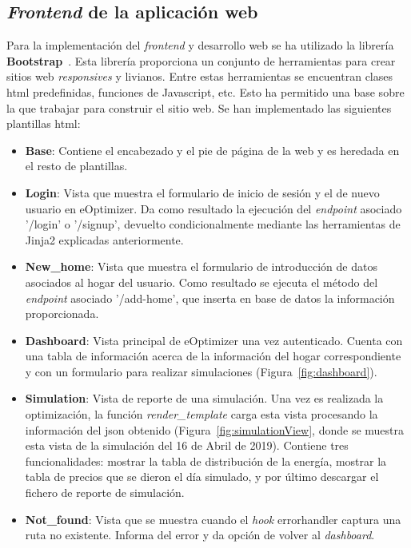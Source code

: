 \subsection{\textit{Frontend} de la aplicación web}
Para la implementación del \textit{frontend} y desarrollo web se ha utilizado la librería \textbf{Bootstrap}~\cite{Boots}. Esta librería proporciona un conjunto de herramientas para crear sitios web \textit{responsives} y livianos. Entre estas herramientas se encuentran clases html predefinidas, funciones de Javascript, etc. Esto ha permitido una base sobre la que trabajar para construir el sitio web. Se han implementado las siguientes plantillas html:
\begin{itemize}
\item \textbf{Base}: Contiene el encabezado y el pie de página de la web y es heredada en el resto de plantillas.
\item \textbf{Login}: Vista que muestra el formulario de inicio de sesión y el de nuevo usuario en eOptimizer. Da como resultado la ejecución del \textit{endpoint} asociado '/login' o '/signup', devuelto condicionalmente mediante las herramientas de Jinja2 explicadas anteriormente.
\item \textbf{New\_home}: Vista que muestra el formulario de introducción de datos asociados al hogar del usuario. Como resultado se ejecuta el método del \textit{endpoint} asociado '/add-home', que inserta en base de datos la información proporcionada.
\item \textbf{Dashboard}: Vista principal de eOptimizer una vez autenticado. Cuenta con una tabla de información acerca de la información del hogar correspondiente y con un formulario para realizar simulaciones (Figura~\ref{fig:dashboard}).
\item \textbf{Simulation}: Vista de reporte de una simulación. Una vez es realizada la optimización, la función \textit{render\_template} carga esta vista procesando la información del json obtenido (Figura~\ref{fig:simulationView}, donde se muestra esta vista de la simulación del 16 de Abril de 2019). Contiene tres funcionalidades: mostrar la tabla de distribución de la energía, mostrar la tabla de precios que se dieron el día simulado, y por último descargar el fichero de reporte de simulación.
\item \textbf{Not\_found}: Vista que se muestra cuando el \textit{hook} errorhandler captura una ruta no existente. Informa del error y da opción de volver al \textit{dashboard}.
\end{itemize}
